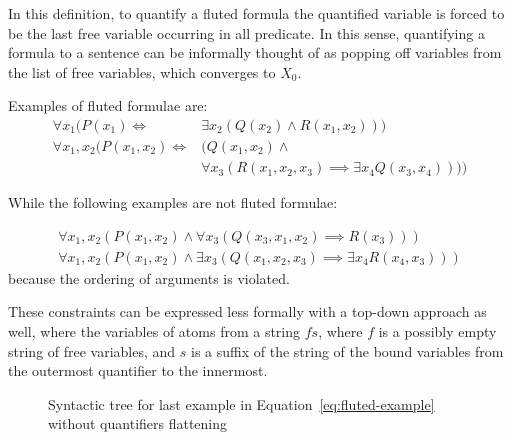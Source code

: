 In this definition, to quantify a fluted formula the quantified variable is forced to be the last free variable occurring in all predicate. In this sense, quantifying a formula to a sentence can be informally thought of as popping off variables from the list of free variables, which converges to \(X_0\).


Examples of fluted formulae are:
\begin{equation}\label{eq:fluted-example}
  \begin{aligned}
    \forall x_1 (P(x_1) \iff &\exists x_2(Q(x_2) \land R(x_1, x_2)))\\
    \forall x_1,x_2 (P(x_1,x_2) \iff &  (Q(x_1,x_2) \land\\
                                     &  \forall x_3 (R(x_1,x_2,x_3) \implies \exists x_4 Q(x_3,x_4))))
  \end{aligned}
\end{equation}

While the following examples are not fluted formulae:

\begin{equation}\label{eq:not-fluted-example}
  \begin{aligned}
    \forall x_1,x_2(P(x_1,x_2) \land \forall x_3(Q(x_3,x_1,x_2) \implies R(x_3)))\\
    \forall x_1,x_2(P(x_1,x_2) \land \exists x_3(Q(x_1,x_2,x_3) \implies \exists x_4 R(x_4,x_3)))
  \end{aligned}
\end{equation}
because the ordering of arguments is violated.

These constraints can be expressed less formally with a top-down approach as well, where the variables of atoms from a string \(fs\), where \(f\) is a possibly empty string of free variables, and \(s\) is a suffix of the string of the bound variables from the outermost quantifier to the innermost.

\begin{figure}[H]
    \centering
    \caption{Syntactic tree for last example in Equation~\ref{eq:fluted-example} without quantifiers flattening}\label{fig:fluted_syntree}
\end{figure}

